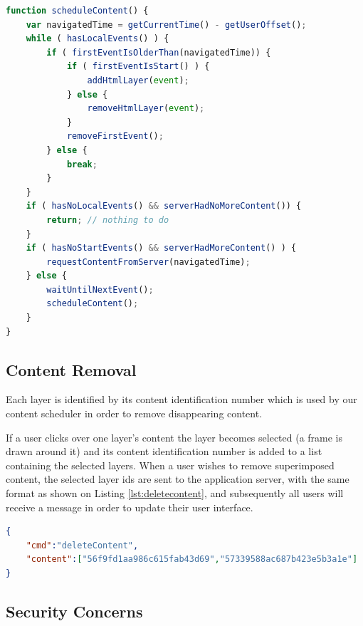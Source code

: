 \begin{minipage}{\linewidth}
\begin{lstlisting}[caption={Pseudo code for hyper content scheduler},label={lst:pseudo_render},language=JavaScript]
function scheduleContent() {
    var navigatedTime = getCurrentTime() - getUserOffset();
    while ( hasLocalEvents() ) {
        if ( firstEventIsOlderThan(navigatedTime)) {
            if ( firstEventIsStart() ) {
            	addHtmlLayer(event);
            } else {
            	removeHtmlLayer(event);
            }
            removeFirstEvent();
        } else {
            break;
        }
    }
    if ( hasNoLocalEvents() && serverHadNoMoreContent()) {
    	return;	// nothing to do
    } 
    if ( hasNoStartEvents() && serverHadMoreContent() ) { 
       	requestContentFromServer(navigatedTime);
    } else {
        waitUntilNextEvent();
        scheduleContent();
    }
}
\end{lstlisting}
\end{minipage}

	\subsection{Content Removal}
		Each layer is identified by its content identification number which is used by our content scheduler in order to remove disappearing content.

		If a user clicks over one layer's content the layer becomes selected (a frame is drawn around it) and its content identification number is added to a list containing the selected layers. When a user wishes to remove superimposed content, the selected layer ids are sent to the application server, with the same format as shown on Listing \ref{lst:deletecontent}, and subsequently all users will receive a message in order to update their user interface.


\begin{minipage}{\linewidth}
\begin{lstlisting}[caption={Example of removing content message sent by one user},label={lst:deletecontent},language=json]
{
	"cmd":"deleteContent",
	"content":["56f9fd1aa986c615fab43d69","57339588ac687b423e5b3a1e"]
}
\end{lstlisting}
\end{minipage}

	\subsection{Security Concerns}

